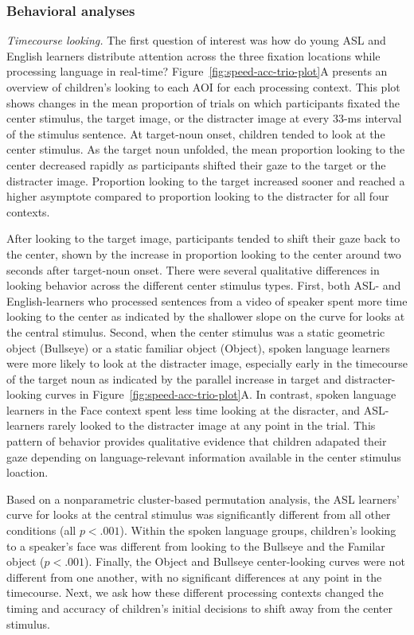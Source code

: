 \documentclass[,man,floatsintext]{apa6}
\begin{document}
\hypertarget{behavioral-analyses}{%
\subsubsection{Behavioral analyses}\label{behavioral-analyses}}

\emph{Timecourse looking.} The first question of interest was how do young ASL and English learners distribute attention across the three fixation locations while processing language in real-time? Figure~\ref{fig:speed-acc-trio-plot}A presents an overview of children's looking to each AOI for each processing context. This plot shows changes in the mean proportion of trials on which participants fixated the center stimulus, the target image, or the distracter image at every 33-ms interval of the stimulus sentence. At target-noun onset, children tended to look at the center stimulus. As the target noun unfolded, the mean proportion looking to the center decreased rapidly as participants shifted their gaze to the target or the distracter image. Proportion looking to the target increased sooner and reached a higher asymptote compared to proportion looking to the distracter for all four contexts.

After looking to the target image, participants tended to shift their gaze back to the center, shown by the increase in proportion looking to the center around two seconds after target-noun onset. There were several qualitative differences in looking behavior across the different center stimulus types. First, both ASL- and English-learners who processed sentences from a video of speaker spent more time looking to the center as indicated by the shallower slope on the curve for looks at the central stimulus. Second, when the center stimulus was a static geometric object (Bullseye) or a static familiar object (Object), spoken language learners were more likely to look at the distracter image, especially early in the timecourse of the target noun as indicated by the parallel increase in target and distracter-looking curves in Figure~\ref{fig:speed-acc-trio-plot}A. In contrast, spoken language learners in the Face context spent less time looking at the disracter, and ASL-learners rarely looked to the distracter image at any point in the trial. This pattern of behavior provides qualitative evidence that children adapated their gaze depending on language-relevant information available in the center stimulus loaction.

Based on a nonparametric cluster-based permutation analysis, the ASL learners' curve for looks at the central stimulus was significantly different from all other conditions (all \(p < .001\)). Within the spoken language groups, children's looking to a speaker's face was different from looking to the Bullseye and the Familar object (\(p < .001\)). Finally, the Object and Bullseye center-looking curves were not different from one another, with no significant differences at any point in the timecourse. Next, we ask how these different processing contexts changed the timing and accuracy of children's initial decisions to shift away from the center stimulus.
\end{document}
